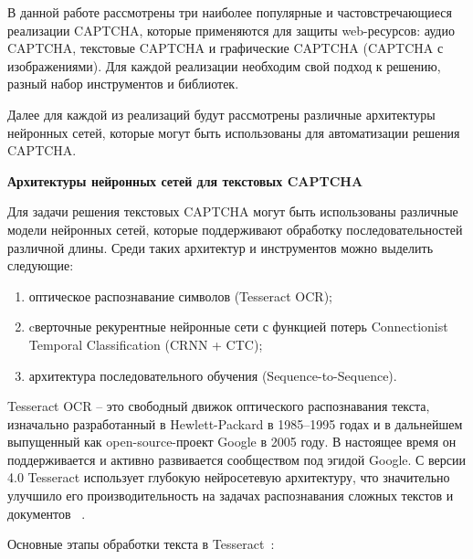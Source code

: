В данной работе рассмотрены три наиболее популярные и частовстречающиеся 
реализации CAPTCHA, которые применяются для защиты web-ресурсов: аудио CAPTCHA, 
текстовые CAPTCHA и графические CAPTCHA (CAPTCHA с изображениями). Для каждой 
реализации необходим свой подход к решению, разный набор инструментов и библиотек.

Далее для каждой из реализаций будут рассмотрены различные архитектуры нейронных 
сетей, которые могут быть использованы для автоматизации решения CAPTCHA.

\textbf{Архитектуры нейронных сетей для текстовых CAPTCHA}

Для задачи решения текстовых CAPTCHA могут быть использованы различные модели 
нейронных сетей, которые поддерживают обработку последовательностей различной 
длины. Среди таких архитектур и инструментов можно выделить следующие:

\begin{enumerate}
    \item оптическое распознавание символов (Tesseract OCR);
    \item cверточные рекурентные нейронные сети с функцией потерь Connectionist 
    Temporal Classification (CRNN + CTC);
    \item архитектура последовательного обучения (Sequence-to-Sequence).
\end{enumerate}

Tesseract OCR -- это свободный движок оптического распознавания текста, 
изначально разработанный в Hewlett-Packard в 1985–1995 годах и в дальнейшем 
выпущенный как open-source-проект Google в 2005 году. В настоящее время он 
поддерживается и активно развивается сообществом под эгидой Google. С версии 4.0 
Tesseract использует глубокую нейросетевую архитектуру, что значительно улучшило 
его производительность на задачах распознавания сложных текстов и документов
~\cite{tesseract}.

Основные этапы обработки текста в Tesseract~\cite{tesseractbook}:


